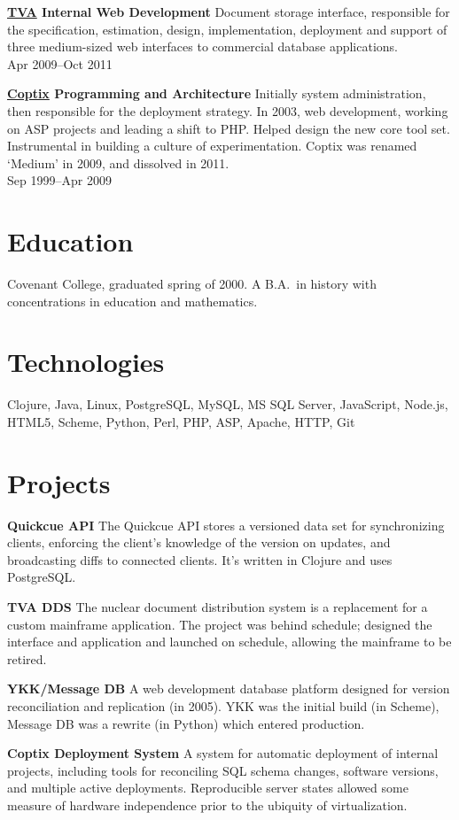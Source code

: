 \documentclass[margin]{res}
\begin{document}
\begin{resume}
{\bf \href{http://tva.gov/}{TVA} Internal Web Development}
%
Document storage interface, responsible for the specification,
estimation, design, implementation, deployment and support of three
medium-sized web interfaces to commercial database applications.\\
%
Apr 2009--Oct 2011

{\bf \href{http://thisismedium.com/}{Coptix} Programming and Architecture}
%
Initially system administration, then responsible for the deployment
strategy. In 2003, web development, working on ASP projects and
leading a shift to PHP. Helped design the new core tool set.
Instrumental in building a culture of experimentation. Coptix was
renamed `Medium' in 2009, and dissolved in 2011.\\
%
Sep 1999--Apr 2009

\section{Education}

Covenant College, graduated spring of 2000. A B.A.\ in
history with concentrations in education and mathematics.

\section{Technologies}

Clojure, Java, Linux,
PostgreSQL, MySQL, MS SQL Server,
JavaScript, Node.js, HTML5,
Scheme, Python, Perl, PHP, ASP,
Apache, HTTP, Git

\section{Projects}
{\bf Quickcue API} The Quickcue API stores a versioned data set for
synchronizing clients, enforcing the client's knowledge of the version
on updates, and broadcasting diffs to connected clients. It's written
in Clojure and uses PostgreSQL.

{\bf TVA DDS} The nuclear document distribution system is a
replacement for a custom mainframe application. The project was behind
schedule; designed the interface and application and launched on
schedule, allowing the mainframe to be retired.

{\bf YKK/Message DB} A web development database platform designed for
version reconciliation and replication (in 2005). YKK was the initial
build (in Scheme), Message DB was a rewrite (in Python) which entered
production.

{\bf Coptix Deployment System} A system for automatic deployment of
internal projects, including tools for reconciling SQL schema changes,
software versions, and multiple active deployments. Reproducible
server states allowed some measure of hardware independence prior to
the ubiquity of virtualization.

\end{resume}
\end{document}
